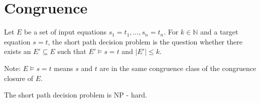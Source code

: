 \chapter*{Congruence}

\begin{definition}

Let $E$ be a set of input equations $s_1 = t_1,\ldots,s_n = t_n$.
For $k \in \mathbb{N}$ and a target equation $s = t$, the short path decision problem is the question whether there exists an $E' \subseteq E$ such that $E' \models s = t$ and $|E'| \leq k$.

\end{definition}

Note: $E \models s = t$ means $s$ and $t$ are in the same congruence class of the congruence closure of $E$.

\begin{lemma}

The short path decision problem is NP - hard.

\end{lemma}

